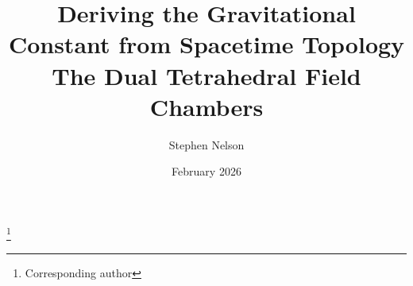\documentclass[aps,prd,preprint,superscriptaddress,showpacs,preprintnumbers,amsmath,amssymb,nofootinbib]{revtex4-2}
\begin{document}
\raggedbottom

\vspace*{3cm}
\title{Deriving the Gravitational Constant from Spacetime Topology\\
\large The Dual Tetrahedral Field Chambers}

\author{Stephen Nelson}
\thanks{Corresponding author}

\date{February 2026}

\end{document}
